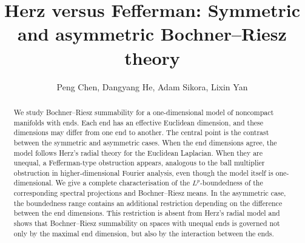 \documentclass[12pt]{amsart}
\begin{document}
\title{Herz versus Fefferman: Symmetric and asymmetric Bochner--Riesz theory}
\author{Peng Chen, Dangyang He, Adam Sikora, Lixin Yan}  
\address{Peng Chen, Department of Mathematics, Sun Yat-sen (Zhongshan)
University, Guangzhou, 510275, P.R. China}
\address{Dangyang He, Department of Mathematics, Sun Yat-sen (Zhongshan) University, Guangzhou, 510275, P.R. China}
\address{Adam Sikora, School of Mathematical and Physical Sciences, Macquarie University, NSW 2109, Australia}
\address{Lixin Yan, Department of Mathematics, Sun Yat-sen (Zhongshan) University,
Guangzhou, 510275, P.R. China}




\begin{abstract}
We study Bochner--Riesz summability for a one-dimensional model of
noncompact manifolds with ends. Each end has an effective Euclidean
dimension, and these dimensions may differ from one end to
another. The central point is the contrast between the symmetric and
asymmetric cases. When the end dimensions agree, the model follows
Herz's radial theory for the Euclidean Laplacian. When they are unequal,
a Fefferman-type obstruction appears, analogous to the ball
multiplier obstruction in higher-dimensional Fourier analysis, even
though the model itself is one-dimensional. We give a complete
characterisation of the \(L^p\)-boundedness of the corresponding spectral
projections and Bochner--Riesz means. In the asymmetric case, the
boundedness range contains an additional restriction depending on the
difference between the end dimensions. This restriction is absent from
Herz's radial model and shows that Bochner--Riesz summability on spaces
with unequal ends is governed not only by the maximal end dimension, but
also by the interaction between the ends.

\end{abstract}

\maketitle

\hypersetup{linkcolor=black}
\tableofcontents
\hypersetup{linkcolor=red}
\end{document}
